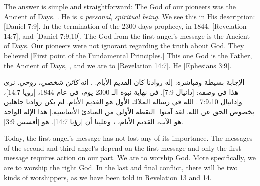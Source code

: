 The answer is simple and straightforward: The God of our pioneers was the Ancient of Days. . He is \textit{a personal}, \textit{spiritual being}. We see this in His description: [Daniel 7:9]. In the termination of the 2300 days prophecy, in 1844, [Revelation 14:7],  and [Daniel 7:9,10]. The God from the first angel’s message is the Ancient of Days. Our pioneers were not ignorant regarding the truth about God. They believed [First point of the Fundamental Principles.] This one God is the Father, the Ancient of Days, , and we are to [Revelation 14:7]. He [Ephesians 3:9].


الإجابة بسيطة ومباشرة: إله روادنا كان القديم الأيام. . إنه \textit{كائن شخصي}، \textit{روحي}. نرى هذا في وصفه: [دانيال 7:9]. في نهاية نبوة الـ 2300 يوم، في عام 1844، [رؤيا 14:7]،  و[دانيال 7:9،10]. الله في رسالة الملاك الأول هو القديم الأيام. لم يكن روادنا جاهلين بخصوص الحق عن الله. لقد آمنوا [النقطة الأولى من المبادئ الأساسية.] هذا الإله الواحد هو الآب، القديم الأيام، ، وعلينا أن [رؤيا 14:7]. هو [أفسس 3:9].


Today, the first angel’s message has not lost any of its importance. The messages of the second and third angel’s depend on the first message and only the first message requires action on our part. We are to worship God. More specifically, we are to worship the right God. In the last and final conflict, there will be two kinds of worshippers, as we have been told in Revelation 13 and 14.


